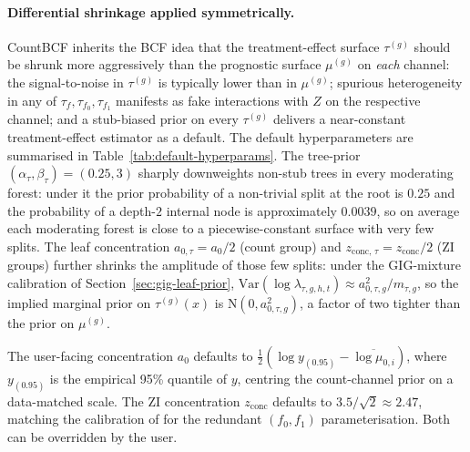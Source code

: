 \documentclass[11pt]{article}
\theoremstyle{plain}
\theoremstyle{definition}
\theoremstyle{remark}
\newcommand{\N}{\mathrm{N}}
\newcommand{\Var}{\mathrm{Var}}
\newcommand{\tauF}{\tau_f}
\newcommand{\azero}{a_{0}}
\newcommand{\azerotau}{a_{0,\tau}}
\newcommand{\fzeroSym}{f_{0}}
\newcommand{\foneSym}{f_{1}}
\newcommand{\tauFzero}{\tau_{f_{0}}}
\newcommand{\tauFone}{\tau_{f_{1}}}
\newcommand{\zconc}{z_{\mathrm{conc}}}
\newcommand{\zconctau}{z_{\mathrm{conc},\,\tau}}
\begin{document}
\paragraph{Differential shrinkage applied symmetrically.}
CountBCF inherits the BCF \citep{hahn2020bayesian} idea that the
treatment-effect surface $\tau^{(g)}$ should be shrunk more
aggressively than the prognostic surface $\mu^{(g)}$ on \emph{each}
channel: the signal-to-noise in $\tau^{(g)}$ is typically lower than
in $\mu^{(g)}$; spurious heterogeneity in any of $\tauF, \tauFzero,
\tauFone$ manifests as fake interactions with $Z$ on the respective
channel; and a stub-biased prior on every $\tau^{(g)}$ delivers a
near-constant treatment-effect estimator as a default. The default
hyperparameters are summarised in
Table~\ref{tab:default-hyperparams}. The tree-prior
$(\alpha_\tau, \beta_\tau) = (0.25, 3)$ sharply downweights non-stub
trees in every moderating forest: under it the prior probability of a
non-trivial split at the root is $0.25$ and the probability of a
depth-$2$ internal node is approximately $0.0039$, so on average each
moderating forest is close to a piecewise-constant surface with very
few splits. The leaf concentration $\azerotau = \azero / 2$ (count
group) and $\zconctau = \zconc / 2$ (ZI groups) further shrinks the
amplitude of those few splits: under the GIG-mixture calibration of
Section~\ref{sec:gig-leaf-prior},
$\Var(\log \lambda_{\tau, g, h, t}) \approx a_{0, \tau, g}^2 /
m_{\tau, g}$, so the implied marginal prior on $\tau^{(g)}(x)$ is
$\N(0, a_{0, \tau, g}^2)$, a factor of two tighter than the prior on
$\mu^{(g)}$.

The user-facing concentration $\azero$ defaults to
$\tfrac{1}{2}(\log y_{(0.95)} - \overline{\log \mu_{0,i}})$, where
$y_{(0.95)}$ is the empirical 95\% quantile of $y$, centring the
count-channel prior on a data-matched scale. The ZI concentration
$\zconc$ defaults to $3.5 / \sqrt{2} \approx 2.47$, matching the
calibration of \citet[\S 4.2.2]{murray2021loglinear} for the
redundant $(\fzeroSym, \foneSym)$ parameterisation. Both can be
overridden by the user.
\end{document}
